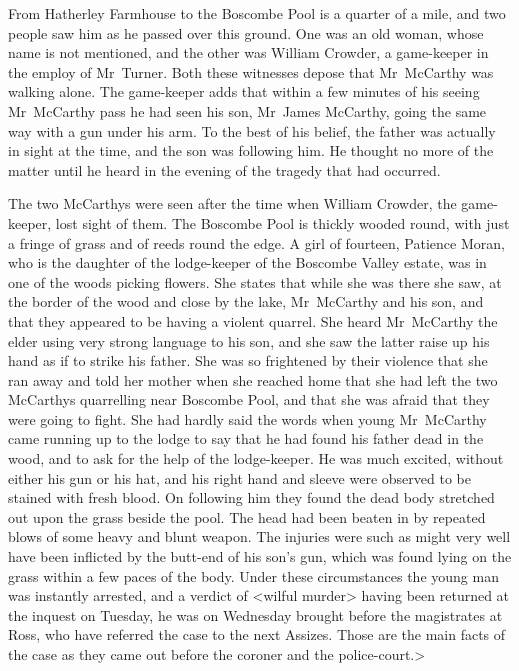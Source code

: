 From Hatherley Farmhouse to the Boscombe Pool is a quarter of a mile, and two people saw him as he passed over this ground. One was an old woman, whose name is not mentioned, and the other was William Crowder, a game-keeper in the employ of Mr~Turner. Both these witnesses depose that Mr~McCarthy was walking alone. The game-keeper adds that within a few minutes of his seeing Mr~McCarthy pass he had seen his son, Mr~James McCarthy, going the same way with a gun under his arm. To the best of his belief, the father was actually in sight at the time, and the son was following him. He thought no more of the matter until he heard in the evening of the tragedy that had occurred.

The two McCarthys were seen after the time when William Crowder, the game-keeper, lost sight of them. The Boscombe Pool is thickly wooded round, with just a fringe of grass and of reeds round the edge. A girl of fourteen, Patience Moran, who is the daughter of the lodge-keeper of the Boscombe Valley estate, was in one of the woods picking flowers. She states that while she was there she saw, at the border of the wood and close by the lake, Mr~McCarthy and his son, and that they appeared to be having a violent quarrel. She heard Mr~McCarthy the elder using very strong language to his son, and she saw the latter raise up his hand as if to strike his father. She was so frightened by their violence that she ran away and told her mother when she reached home that she had left the two McCarthys quarrelling near Boscombe Pool, and that she was afraid that they were going to fight. She had hardly said the words when young Mr~McCarthy came running up to the lodge to say that he had found his father dead in the wood, and to ask for the help of the lodge-keeper. He was much excited, without either his gun or his hat, and his right hand and sleeve were observed to be stained with fresh blood. On following him they found the dead body stretched out upon the grass beside the pool. The head had been beaten in by repeated blows of some heavy and blunt weapon. The injuries were such as might very well have been inflicted by the butt-end of his son's gun, which was found lying on the grass within a few paces of the body. Under these circumstances the young man was instantly arrested, and a verdict of <wilful murder> having been returned at the inquest on Tuesday, he was on Wednesday brought before the magistrates at Ross, who have referred the case to the next Assizes. Those are the main facts of the case as they came out before the coroner and the police-court.>

